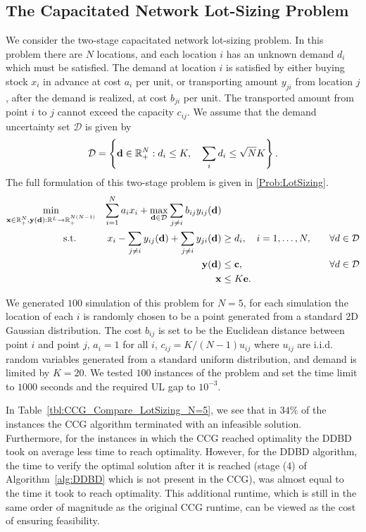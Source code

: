 \documentclass[12pt,x11names]{article}
\theoremstyle{definition}
\newcommand{\paren}[1]{\left\{ {#1} \right\}} %
\newcommand{\real}{\mathbb{R}} %
\newcommand{\bone}{{\bf e}}
\newcommand{\bc}{{\bf c}}
\newcommand{\bd}{{\bf d}}
\newcommand{\bx}{{\bf x}}
\newcommand{\by}{{\bf y}}
\begin{document}
\subsection{The Capacitated Network Lot-Sizing Problem}
We consider the two-stage capacitated network lot-sizing problem. In this problem there are $N$ locations, and each location $i$ has an unknown demand $d_i$ which must be satisfied. The demand at location $i$ is satisfied by either buying stock $x_i$ in advance at cost $a_i$ per unit, or transporting amount $y_{ji}$ from location $j$, after the demand is realized, at cost $b_{ji}$ per unit. The transported amount from point $i$ to $j$ cannot exceed the capacity $c_{ij}$. We assume that the demand uncertainty set $\mathcal{D}$ is given by 
$$\mathcal{D}=\paren{\bd\in\real^N_+: d_i\leq  K,\quad\sum_i d_i\leq \sqrt{N}K}.$$
The full formulation of this two-stage problem is given in \eqref{Prob:LotSizing}.
\begin{equation}\label{Prob:LotSizing}
\begin{aligned}[t]
\min_{\bx\in\real^N_+,\by(\bd):\real^L\rightarrow\real^{N(N-1)}_+}&& \sum_{i=1}^{N} a_ix_i+\max_{\bd\in\mathcal{D}}\sum_{j\neq i} b_{ij}y_{ij}(\bd)&&\\
\qquad\text{s.t.}\qquad&& x_i-\sum_{j\neq i} y_{ij}(\bd)+\sum_{j\neq i} y_{ji}(\bd)&\geq d_i,\quad i=1,\ldots,N,\quad &\forall d\in \mathcal{D}\\
&&\by(\bd)&\leq \bc,\quad&\forall d\in \mathcal{D}\\
&&\bx&\leq K\bone.&\\
\end{aligned}
\end{equation}

We generated $100$ simulation of this problem for $N=5$, for each simulation the location of each $i$ is randomly chosen to be a point generated from a standard 2D Gaussian distribution. The cost $b_{ij}$ is set to be the Euclidean distance between point $i$ and point $j$, $a_i=1$ for all $i$, $c_{ij}=K/(N-1)u_{ij}$ where $u_{ij}$ are i.i.d. random variables generated from a standard uniform distribution, and demand is limited by $K=20$. We tested $100$ instances of the problem and set the time limit to $1000$ seconds and the required UL gap to $10^{-3}$.  

In Table~\ref{tbl:CCG_Compare_LotSizing_N=5}, we see that in $34\%$ of the instances the CCG algorithm terminated with an infeasible solution. Furthermore, for the instances in which the CCG reached optimality the DDBD took on average less time to reach optimality. However, for the DDBD algorithm, the time to verify the optimal solution after it is reached (stage (4) of Algorithm~\ref{alg:DDBD} which is not present in the CCG), was almost equal to the time it took to reach optimality. This additional runtime, which is still in the same order of magnitude as the original CCG runtime, can be viewed as the cost of ensuring feasibility.
\end{document}

